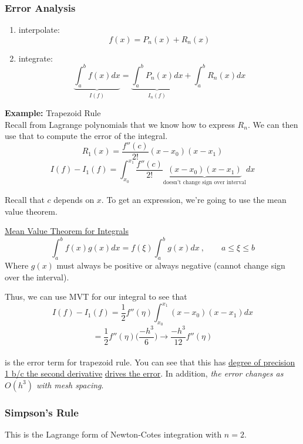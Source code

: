 \documentclass[12pt]{exam}
\begin{document}
\subsubsection*{Error Analysis}
\begin{enumerate}
\item interpolate:
\[f(x) = P_n(x) + R_n(x)\]
\item integrate:
\[\underbrace{\int_a^b f(x) dx}_{I(f)} = \underbrace{\int_a^b P_n(x)dx}_{I_n(f)} + \int_a^b R_n(x) dx\]
\end{enumerate}

\textbf{Example:} Trapezoid Rule\\
Recall from Lagrange polynomials that we know how to express $R_n$. We can then use that to compute the error of the integral.
\[
R_1(x) = \frac{f''(c)}{2!}(x-x_0)(x-x_1) \]
\ifprintanswers
\[
I(f) - I_1(f) = \int_{x_0}^{x_1} \frac{f''(c)}{2!}\underbrace{(x-x_0)(x-x_1)}_{\text{doesn't change sign over interval}} dx\]
\else
\vspace*{2em}
\fi

%
Recall that $c$ depends on $x$. To get an expression, we're going to use the mean value theorem.

\underline{Mean Value Theorem for Integrals}\\
\[\int_a^b f(x)g(x)dx = f(\xi) \int_a^b g(x)dx\:, \qquad a\leq \xi \leq b\]
Where $g(x)$ must always be positive or always negative (cannot change sign over the interval).

Thus, we can use MVT for our integral to see that
\[
I(f) - I_1(f) = \frac{1}{2}f''(\eta) \int_{x_0}^{x_1} (x-x_0)(x-x_1) dx \]
\ifprintanswers
\[= \frac{1}{2}f''(\eta) \bigl(\frac{-h^3}{6}\bigr) \rightarrow \boxed{\frac{-h^3}{12}f''(\eta)}\]
\else
\vspace*{2em}\\
\fi
is the error term for trapezoid rule. You can see that this has \underline{degree of precision 1 b/c the second derivative} \underline{drives the error}. In addition, \textit{the error changes as $O(h^3)$ with mesh spacing}.


\vspace*{-1em}
\subsubsection*{Simpson's Rule}
This is the Lagrange form of Newton-Cotes integration with $n=2$.
\end{document}

